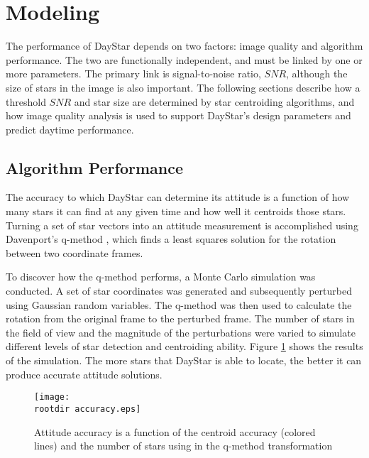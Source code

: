 \documentclass[twocolumn,letterpaper]{IEEEAerospace2012}
\newcommand{\rootdir}{./Figures/}
\newcommand{\SNR}{\mathit{SNR}}
\begin{document}
\section{Modeling}
The performance of DayStar depends on two factors: image quality and algorithm performance. The two are functionally independent, and must be linked by one or more parameters. The primary link is signal-to-noise ratio, $\SNR$, although the size of stars in the image is also important. The following sections describe how a threshold $\SNR$ and star size are determined by star centroiding algorithms, and how image quality analysis is used to support DayStar's design parameters and predict daytime performance.

\subsection{Algorithm Performance}
The accuracy to which DayStar can determine its attitude is a function of how many stars it can find at any given time and how well it centroids those stars. Turning a set of star vectors into an attitude measurement is accomplished using Davenport's q-method \cite{qmethod}, which finds a least squares solution for the rotation between two coordinate frames.

To discover how the q-method performs, a Monte Carlo simulation was conducted. A set of star coordinates was generated and subsequently perturbed using Gaussian random variables. The q-method was then used to calculate the rotation from the original frame to the perturbed frame. The number of stars in the field of view and the magnitude of the perturbations were varied to simulate different levels of star detection and centroiding ability. Figure \ref{fig:accuracy} shows the results of the simulation. The more stars that DayStar is able to locate, the better it can produce accurate attitude solutions.
\begin{figure}[H]
    \centering
    \texttt{[image: \\rootdir accuracy.eps]}
    \caption{Attitude accuracy is a function of the centroid accuracy (colored lines) and the number of stars using in the q-method transformation}
    \label{fig:accuracy}
\end{figure}
\end{document}
